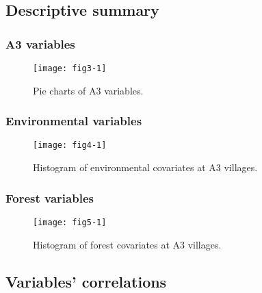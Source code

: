 \documentclass{article}\usepackage[]{graphicx}\usepackage[]{color}
\begin{document}
\newpage

\subsection{Descriptive summary}
\subsubsection{A3 variables}


\begin{figure}[hbp]
\begin{center}

\texttt{[image: fig3-1]}
\end{center}
\caption{Pie charts of A3 variables.}
\label{fig:Pie_Chart_A3}
\end{figure}

\newpage
\subsubsection{Environmental variables}

\begin{figure}[hbp]
\begin{center}

\texttt{[image: fig4-1]}
\end{center}
\caption{Histogram of environmental covariates at A3 villages.}
\label{fig:Histogram_Environmental_Covariates}
\end{figure}

\newpage
\subsubsection{Forest variables}

\begin{figure}[hbp]
\begin{center}

\texttt{[image: fig5-1]}
\end{center}
\caption{Histogram of forest covariates at A3 villages.}
\label{fig:Histogram_Forest_Covariates}
\end{figure}

\newpage

\subsection{Variables' correlations}
\end{document}
